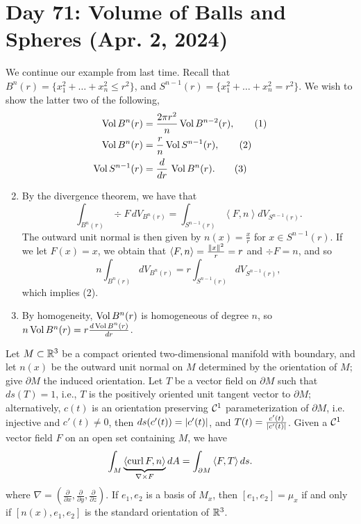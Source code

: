 \section{Day 71: Volume of Balls and Spheres (Apr. 2, 2024)}
We continue our example from last time. Recall that $B^n(r) = \{x_1^2 + \dots + x_n^2 \leq r^2\}$, and $S^{n-1}(r) = \{x_1^2 + \dots + x_n^2 = r^2\}$. We wish to show the latter two of the following,
\begin{align*}
    \operatorname{Vol} B^n(r) &= \frac{2\pi r^2}{n} \operatorname{Vol} B^{n-2}(r), \tag{1} \\
    \operatorname{Vol} B^n(r) &= \frac{r}{n} \operatorname{Vol} S^{n-1}(r), \tag{2} \\
    \operatorname{Vol} S^{n-1}(r) &= \frac{d}{dr} \, \operatorname{Vol} B^n(r). \tag{3}
\end{align*}
\begin{enumerate}[label=(\roman*)] \setcounter{enumi}{1}
    \item By the divergence theorem, we have that
    \[ \int_{B^n(r)} \div F \, dV_{B^n(r)} = \int_{S^{n-1}(r)} \left<F, n\right> dV_{S^{n-1}(r)}. \]
    The outward unit normal is then given by $n(x) = \frac{x}{r}$ for $x \in S^{n-1}(r)$. If we let $F(x) = x$, we obtain that $\left<F, n\right> = \frac{\left\lVert x \right\rVert^2}{r} = r$ and $\div F = n$, and so
    \[ n \int_{B^n(r)} dV_{B^n(r)} = r \int_{S^{n-1}(r)} dV_{S^{n-1}(r)}, \]
    which implies (2).
    \item By homogeneity, $\operatorname{Vol} B^n(r)$ is homogeneous of degree $n$, so $n \operatorname{Vol} B^n(r) = r \frac{d \operatorname{Vol} B^n(r)}{dr}$.
\end{enumerate}
\begin{simplethm}
    Let $M \subset \mathbb R^3$ be a compact oriented two-dimensional manifold with boundary, and let $n(x)$ be the outward unit normal on $M$ determined by the orientation of $M$; give $\partial M$ the induced orientation. Let $T$ be a vector field on $\partial M$ such that $ds(T) = 1$, i.e., $T$ is the positively oriented unit tangent vector to $\partial M$; alternatively, $c(t)$ is an orientation preserving $\mathcal C^1$ parameterization of $\partial M$, i.e. injective and $c'(t) \neq 0$, then $ds(c'(t)) = \left\lvert c'(t) \right\rvert$, and $T(t) = \frac{c'(t)}{\left\lvert c'(t) \right\rvert}$.
    \medskip\newline
    Given a $\mathcal C^1$ vector field $F$ on an open set containing $M$, we have
    \[ \int_M \underbrace{\left<\operatorname{curl} F, n\right>}_{\nabla \times F} dA = \int_{\partial M} \left<F, T\right> ds. \]
    where $\nabla = (\frac{\partial}{\partial x}, \frac{\partial}{\partial y}, \frac{\partial}{\partial z})$. If $e_1, e_2$ is a basis of $M_x$, then $[e_1, e_2] = \mu_x$ if and only if $[n(x), e_1, e_2]$ is the standard orientation of $\mathbb R^3$.
\end{simplethm}
